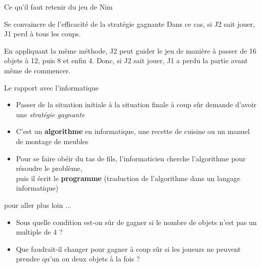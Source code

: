 \begin{frame}{Ce qu'il faut retenir du jeu de Nim}
\begin{block}{Se convaincre de l'efficacité de la stratégie gagnante}
    Dans ce cas, si J2 sait jouer, J1 perd à tous les coups.
    
    En appliquant la même méthode, J2 peut guider le jeu de manière à passer de
    16 objets à 12, puis 8 et enfin 4. Donc, si J2 sait jouer, J1 a perdu la
    partie avant même de commencer.
    
  \end{block}

  \begin{block}{Le rapport avec l'informatique}
    \begin{itemize}
    \item Passer de la situation initiale à la situation finale à coup sûr demande d'avoir
      une \textit{stratégie gagnante}
    \item C'est un \alert{\textbf{algorithme}} en informatique, une recette de
      cuisine ou un manuel de montage de meubles
    \item Pour se faire obéir du tas de fils, l'informaticien cherche
      l'algorithme pour résoudre le problème,\\
      puis il écrit le \alert{\textbf{programme}} (traduction de l'algorithme
      dans un langage informatique)
    \end{itemize}
  \end{block}

\end{frame}

\begin{frame}

  \begin{block}{pour aller plus loin ...}
    \begin{itemize}
    \item Sous quelle condition est-on sûr de gagner si le nombre de objets n'est
      pas un multiple de 4 ?
    \item Que faudrait-il changer pour gagner à coup sûr si les joueurs ne peuvent
      prendre qu'un ou deux objets à la fois ?
    \end{itemize}
  \end{block}

\end{frame}

